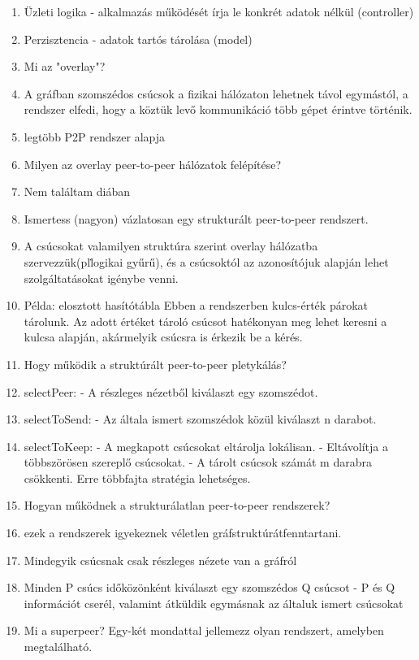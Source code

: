 \documentclass[twoside, a4paper, 12pt]{article}
\begin{document}
\begin{enumerate}
    \item Üzleti logika - alkalmazás működését írja le konkrét adatok nélkül (controller)
    \item Perzisztencia - adatok tartós tárolása (model)
    \item  Mi az "overlay"?
    \item A gráfban szomszédos csúcsok a fizikai hálózaton lehetnek távol egymástól, a rendszer elfedi, hogy a köztük levő kommunikáció
        több gépet érintve történik.
    \item legtöbb P2P rendszer alapja
    \item  Milyen az overlay peer-to-peer hálózatok felépítése?
    \item  Nem találtam diában
    \item  Ismertess (nagyon) vázlatosan egy strukturált peer-to-peer rendszert.
    \item A csúcsokat valamilyen struktúra szerint overlay hálózatba
        szervezzük(pl\. logikai gyűrű),
        és a csúcsoktól az azonosítójuk alapján lehet szolgáltatásokat igénybe venni.
    \item Példa: elosztott hasítótábla Ebben a rendszerben kulcs-érték párokat tárolunk.
        Az adott értéket tároló csúcsot hatékonyan meg lehet keresni a kulcsa alapján, akármelyik csúcsra
        is érkezik be a kérés.
    \item Hogy működik a struktúrált peer-to-peer pletykálás?
    \item selectPeer:
        - A részleges nézetből kiválaszt egy szomszédot.
    \item selectToSend: 
        - Az általa ismert szomszédok közül kiválaszt n darabot.
    \item selectToKeep:
        - A megkapott csúcsokat eltárolja lokálisan.
        - Eltávolítja a többszörösen szereplő csúcsokat.
        - A tárolt csúcsok számát m darabra csökkenti. Erre többfajta stratégia lehetséges.
    \item Hogyan működnek a strukturálatlan peer-to-peer rendszerek?
    \item ezek a rendszerek igyekeznek véletlen gráfstruktúrátfenntartani.
    \item Mindegyik csúcsnak csak részleges nézete van a gráfról 
    \item Minden P csúcs időközönként kiválaszt egy szomszédos Q csúcsot
        - P és Q információt cserél, valamint átküldik egymásnak az általuk ismert csúcsokat
    \item  Mi a superpeer? Egy-két mondattal jellemezz olyan rendszert, amelyben megtalálható.

\end{enumerate}
\end{document}
